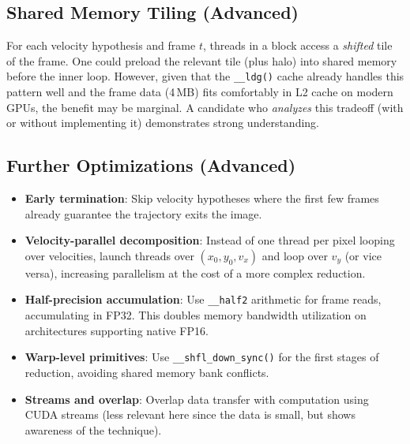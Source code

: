 \documentclass[11pt,letterpaper]{article}
\begin{document}
\subsection{Shared Memory Tiling (Advanced)}
\label{item:shared}

For each velocity hypothesis and frame $t$, threads in a block access a
\emph{shifted} tile of the frame. One could preload the relevant tile
(plus halo) into shared memory before the inner loop. However, given that
the \texttt{\_\_ldg()} cache already handles this pattern well and the frame
data (4\,MB) fits comfortably in L2 cache on modern GPUs, the benefit
may be marginal. A candidate who \emph{analyzes} this tradeoff
(with or without implementing it) demonstrates strong understanding.

\subsection{Further Optimizations (Advanced)}
\label{item:advanced}

\begin{itemize}[leftmargin=2em]
    \item \textbf{Early termination}: Skip velocity hypotheses where the
    first few frames already guarantee the trajectory exits the image.

    \item \textbf{Velocity-parallel decomposition}: Instead of one thread
    per pixel looping over velocities, launch threads over
    $(x_0, y_0, v_x)$ and loop over $v_y$ (or vice versa), increasing
    parallelism at the cost of a more complex reduction.

    \item \textbf{Half-precision accumulation}: Use \texttt{\_\_half2}
    arithmetic for frame reads, accumulating in FP32. This doubles memory
    bandwidth utilization on architectures supporting native FP16.

    \item \textbf{Warp-level primitives}: Use \texttt{\_\_shfl\_down\_sync()}
    for the first stages of reduction, avoiding shared memory bank conflicts.

    \item \textbf{Streams and overlap}: Overlap data transfer with
    computation using CUDA streams (less relevant here since the data is
    small, but shows awareness of the technique).
\end{itemize}

\end{document}
